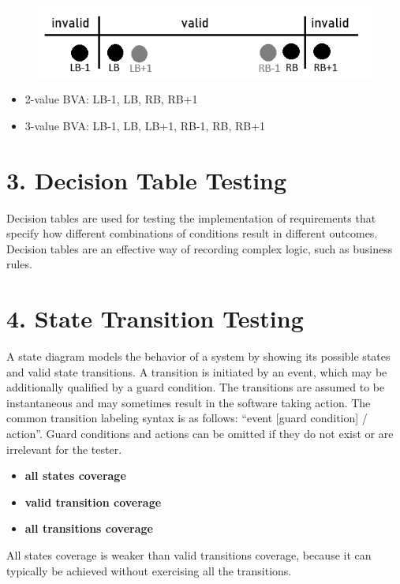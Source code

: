 \documentclass{article}
\begin{document}
\begin{multicols}{3}
{\vspace{-10pt}
\begin{figure}[H]
    \includegraphics[width=1\textwidth]{bva.png}
    \vspace{-10pt}
\end{figure}
    
\begin{itemize}
\item 2-value BVA: LB-1, LB, RB, RB+1
\item 3-value BVA: LB-1, LB, LB+1, RB-1, RB, RB+1
\end{itemize}

\section*{3. Decision Table Testing}
Decision tables are used for testing the implementation of requirements that specify how different combinations of conditions result in different outcomes. Decision tables are an effective way of recording complex logic, such as business rules.\\

\section*{4. State Transition Testing}
A state diagram models the behavior of a system by showing its possible states and valid state transitions. A transition is initiated by an event, which may be additionally qualified by a guard condition. The transitions are assumed to be instantaneous and may sometimes result in the software taking action. The common transition labeling syntax is as follows: “event [guard condition] / action”. Guard conditions and actions can be omitted if they do not exist or are irrelevant for the tester.
\begin{itemize}
\item \textbf{all states coverage}
\item \textbf{valid transition coverage}
\item \textbf{all transitions coverage}
\end{itemize}
All states coverage is weaker than valid transitions coverage, because it can typically be achieved without exercising all the transitions.\\


}
\end{multicols}
\end{document}
